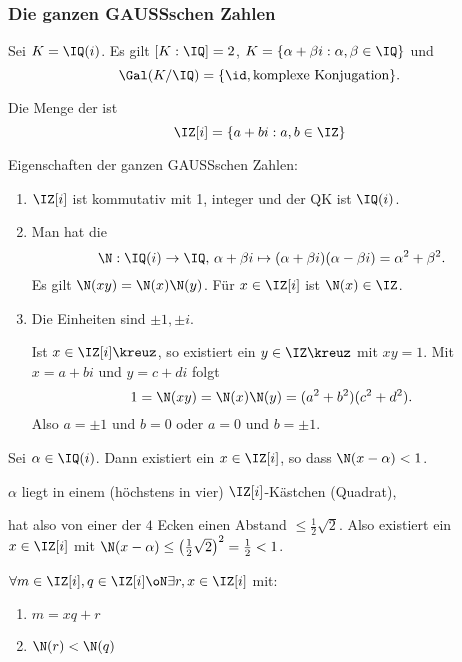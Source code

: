 \subsubsection{Die ganzen GAUSSschen Zahlen}
Sei $K=\IQ(i)$. Es gilt $[K:\IQ]=2$, $K=\{\alpha+\beta i : \alpha,\beta\in\IQ\}$ und \[\Gal(K/\IQ)=\{\id,\mbox{komplexe Konjugation}\}.\]
\begin{Definition}
 Die Menge der  ist \[ \IZ[i]=\{a+bi : a,b\in\IZ\}\] 
\end{Definition}

\begin{Bemerkung} Eigenschaften der ganzen GAUSSschen Zahlen:
 \begin{enumerate}[1)]
  \item $\IZ[i]$ ist kommutativ mit 1, integer und der QK ist $\IQ(i)$.
  \item Man hat die  \[ \N:\IQ(i)\rightarrow\IQ,\, \alpha+\beta i \mapsto (\alpha+\beta i)(\alpha-\beta i)=\alpha^2+\beta^2.\]
  Es gilt $\N(xy)=\N(x)\N(y)$. Für $x\in\IZ[i]$ ist $\N(x)\in\IZ$.
  \item Die Einheiten sind $\pm 1, \pm i$.
  \begin{Beweis}
   Ist $x\in\IZ[i]\kreuz$, so existiert ein $y\in\IZ\kreuz$ mit $xy=1$. Mit $x=a+bi$ und $y=c+di$ folgt \[1=\N(xy)=\N(x)\N(y)=(a^2+b^2)(c^2+d^2).\]
   Also $a=\pm 1$ und $b=0$ oder $a=0$ und $b=\pm 1$.
  \end{Beweis}
 \end{enumerate}
\end{Bemerkung}

\begin{Lemma}
 Sei $\alpha\in\IQ(i)$. Dann existiert ein $x\in\IZ[i]$, so dass $\N(x-\alpha)<1$.
\end{Lemma}

\begin{Beweis}
 $\alpha$ liegt in einem (höchstens in vier) $\IZ[i]$-Kästchen (Quadrat),
 \begin{center}
 \end{center}
 hat also von einer der $4$ Ecken einen Abstand $\leq \frac{1}{2}\sqrt{2}$. Also existiert ein $x\in\IZ[i]$ mit $\N(x-\alpha)\leq \left( \frac{1}{2}\sqrt{2}\right)^2=\frac{1}{2}<1 $. 
\end{Beweis}

\begin{Folgerung}
 $\forall m\in\IZ[i], q\in\IZ[i]\oN \exists r,x\in\IZ[i]$ mit:
 \begin{enumerate}
  \item $m=xq+r$
  \item $\N(r)<\N(q)$
 \end{enumerate}

\end{Folgerung}



